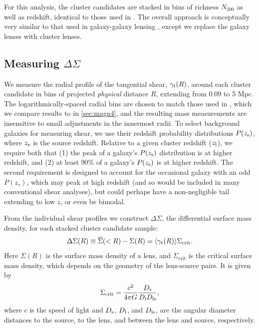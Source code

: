 For this analysis, the cluster candidates are stacked in bins of richness $N_{200}$ as well as redshift, identical to those used in \citet{Ford14}. The overall approach is conceptually very similar to that used in galaxy-galaxy lensing \citep[see][]{Velander14}, except we replace the galaxy lenses with cluster lenses.


\subsection{Measuring $\Delta\Sigma$}
\label{sec:measure4}

We measure the radial profile of the tangential shear, $\gamma_{\rm t}(R)$, around each cluster candidate in bins of projected {\it physical} distance $R$, extending from 0.09 to 5 Mpc. The logarithmically-spaced radial bins are chosen to match those used in \citet{Ford14}, which we compare results to in \autoref{sec:magn4}, and the resulting mass measurements are insensitive to small adjustments in the innermost radii. To select background galaxies for measuring shear, we use their redshift probability distributions $P(z_{\rm s})$, where $z_{\rm s}$ is the source redshift. Relative to a given cluster redshift ($z_{\rm l}$), we require both that (1) the peak of a galaxy's $P(z_{\rm s})$ distribution is at higher redshift, and (2) at least 90\% of a galaxy's $P(z_{\rm s})$ is at higher redshift. The second requirement is designed to account for the occasional galaxy with an odd $P(z_s)$, which may peak at high redshift (and so would be included in many conventional shear analyses), but could perhaps have a non-negligible tail extending to low $z$, or even be bimodal.

From the individual shear profiles we construct $\Delta\Sigma$, the differential surface mass density, for each stacked cluster candidate sample: 
\begin{equation}
\label{eqn:deltasig4}
\Delta\Sigma(R) \equiv \overline{\Sigma}(<R)-\Sigma(R) = \langle \gamma_{\rm t}(R) \rangle \Sigma_{\mathrm{crit}}.
\end{equation}
Here $\Sigma(R)$ is the surface mass density of a lens, and $\Sigma_{\mathrm{crit}}$ is the critical surface mass density, which depends on the geometry of the lens-source pairs. It is given by
\begin{equation}
\label{eqn:sigcrit4}
\Sigma_{\mathrm{crit}} = \frac{c^2}{4 \pi G} \frac{D_{\rm s}}{D_{\rm l} D_{\rm ls}},
\end{equation}
where $c$ is the speed of light and $D_{\rm s}$, $D_{\rm l}$, and $D_{\rm ls}$, are the angular diameter distances to the source, to the lens, and between the lens and source, respectively. 

